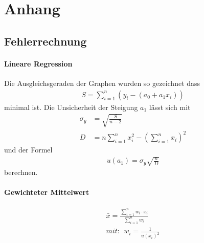 \documentclass[11pt, a4paper]{article}
\begin{document}
    
   
    \section{Anhang}
    \subsection{Fehlerrechnung}
    \paragraph{Lineare Regression}
    Die Ausgleichsgeraden der Graphen wurden so gezeichnet dass
    \begin{align}
        S=\sum_{i=1}^n(y_i - (a_0 + a_1 x_i))
    \end{align}
    minimal ist. Die Unsicherheit der Steigung $a_1$ lässt sich mit
    \begin{align}
        \sigma_y &= \sqrt{\frac{S}{n-2}} \\
        D &= n \sum_{i=1}^n x_i^2 - \left( \sum_{i=1}^n x_i \right)^2
    \end{align}
    und der Formel
    \begin{align}
        u(a_1) = \sigma_y \sqrt{\frac{n}{D}}
    \end{align}
    berechnen.

    \paragraph{Gewichteter Mittelwert}
    \begin{align}
        \bar{x} = \frac{\sum_{i=1}^n w_i \cdot x_i}{\sum_{i=1}^n w_i} \\
        mit: \ \ w_i = \frac{1}{u(x_i)^2}
    \end{align}
\end{document}
